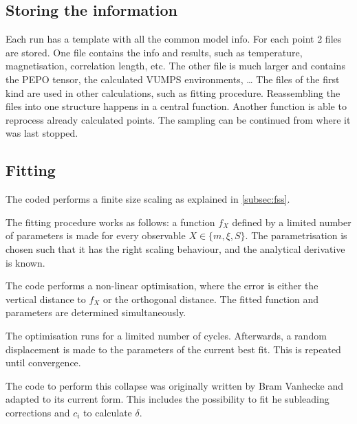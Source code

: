 \subsection{Storing the information}

Each run has a template with all the common model info. For each point 2 files are stored. One file contains the info and results, such as temperature, magnetisation, correlation length, etc. The other file is much larger and contains the PEPO tensor, the calculated VUMPS environments, \dots
The files of the first kind are used in other calculations, such as fitting procedure.  Reassembling the files into one structure happens in a central function. Another function is able to reprocess already calculated points. The sampling can be continued from where it was last stopped.

\subsection{Fitting}\label{subsec:qphasediag}

The coded performs a finite size scaling as explained in \cref{subsec:fss}.

The fitting procedure works as follows: a function $f_X$ defined by a limited number of parameters is made for every observable $X \in \{ m , \xi, S \}$. The parametrisation is chosen such that it has the right scaling behaviour, and the analytical derivative is known.

The code performs a non-linear optimisation, where the error is either the vertical distance to $f_X$ or the orthogonal distance. The fitted function and parameters are determined simultaneously.

The optimisation runs for a limited number of cycles. Afterwards, a random displacement is made to the parameters of the current best fit. This is repeated until convergence.

The code to perform this collapse was originally written by Bram Vanhecke and adapted to its current form. This includes the possibility to fit he subleading corrections and $c_i$ to calculate $\delta$.